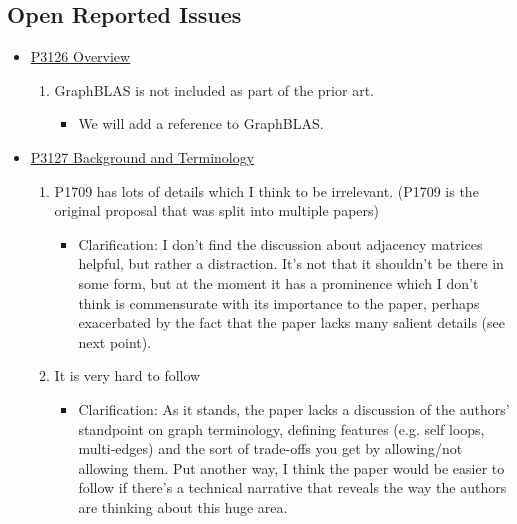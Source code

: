 \subsection{Open Reported Issues}
\begin{itemize}
      \item \href{https://www.wg21.link/P3126}{P3126 Overview}
            \begin{enumerate}
                  \item GraphBLAS is not included as part of the prior art.
                        \begin{itemize}
                              \item We will add a reference to GraphBLAS.
                        \end{itemize}
            \end{enumerate}
      \item \href{https://www.wg21.link/P3127}{P3127 Background and Terminology}
            \begin{enumerate}
                  \item P1709 has lots of details which I think to be irrelevant. (P1709 is the original proposal that was split into multiple papers)
                        \begin{itemize}
                              \item Clarification: I don't find the discussion about adjacency matrices helpful, but rather a distraction. 
                                    It's not that it shouldn't be there in some form, but at the moment it has a prominence which I don't think is 
                                    commensurate with its importance to the paper, perhaps exacerbated by the fact that the paper lacks many salient details (see next point).
                        \end{itemize}
                  \item It is very hard to follow
                        \begin{itemize}
                              \item Clarification: As it stands, the paper lacks a discussion of the authors' standpoint on graph terminology, defining features 
                                    (e.g. self loops, multi-edges) and the sort of trade-offs you get by allowing/not allowing them. Put another way, I think the 
                                    paper would be easier to follow if there's a technical narrative that reveals the way the authors are thinking about this huge area. 


\end{itemize}
\end{enumerate}
\end{itemize}
